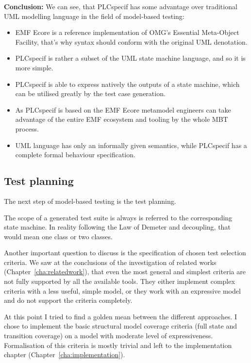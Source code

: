 \textbf{Conclusion:} We can see, that PLCspecif has some advantage over traditional UML modelling language in the field of model-based testing:

\begin{itemize}
	\item EMF Ecore is a reference implementation of OMG's Essential Meta-Object Facility, that's why syntax should conform with the original UML denotation.
	\item PLCspecif is rather a subset of the UML state machine language, and so it is more simple.
	\item PLCspecif is able to express natively the outputs of a state machine, which can be utilised greatly by the test case generation.
	\item As PLCspecif is based on the EMF Ecore metamodel engineers can take advantage of the entire EMF ecosystem and tooling by the whole MBT process.
	\item UML language has only an informally given semantics, while PLCspecif has a complete formal behaviour specification.
\end{itemize}



\subsection{Test planning}
\label{sub:designtestplanning}

The next step of model-based testing is the test planning.

The scope of a generated test suite is always is referred to the corresponding state machine. In reality following the Law of Demeter and decoupling, that would mean one class or two classes.

Another important question to discuss is the specification of chosen test selection criteria. We saw at the conclusions of the investigation of related works (Chapter~\ref{cha:relatedwork}), that even the most general and simplest criteria are not fully supported by all the available tools. They either implement complex criteria with a less useful, simple model, or they work with an expressive model and do not support the criteria completely.

At this point I tried to find a golden mean between the different approaches. I chose to implement the basic structural model coverage criteria (full state and transition coverage) on a model with moderate level of expressiveness. Formalisation of this criteria is mostly trivial and left to the implementation chapter (Chapter~\ref{cha:implementation}).

